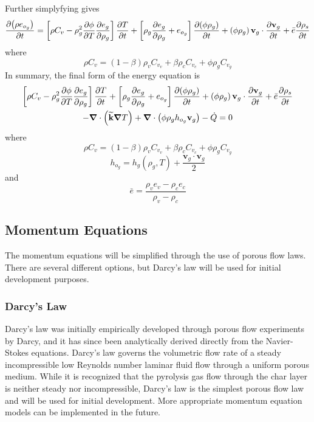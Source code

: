 Further simplyfying gives
\begin{equation}
  {\frac{\partial{\left(\rho e_{o_{g}}\right)}}{\partial{t}}} = \left[\rho C_{v} - \rho_{g}^{2} {\frac{\partial{\phi}}{\partial{T}}}{\frac{\partial{e_{g}}}{\partial{\rho_{g}}}} \right]{\frac{\partial{T}}{\partial{t}}} + \left[ \rho_{g} {\frac{\partial{e_{g}}}{\partial{\rho_{g}}}} + e_{o_{g}} \right]{\frac{\partial{\left(\phi\rho_{g}\right)}}{\partial{t}}} + \left(\phi\rho_{g}\right) \mathbf{v}_{g} \cdot {\frac{\partial{\mathbf{v}_{g}}}{\partial{t}}} + \bar{e}{\frac{\partial{\rho_{s}}}{\partial{t}}}
\end{equation}
where
\begin{equation}
  \rho C_{v} = \left(1 - \beta \right)\rho_{v} C_{v_{v}} + \beta \rho_{c} C_{v_{c}} + \phi \rho_{g} C_{v_{g}}
\end{equation}
In summary, the final form of the energy equation is
\begin{multline}
  \left[\rho C_{v} - \rho_{g}^{2} {\frac{\partial{\phi}}{\partial{T}}}{\frac{\partial{e_{g}}}{\partial{\rho_{g}}}} \right]{\frac{\partial{T}}{\partial{t}}} + \left[ \rho_{g} {\frac{\partial{e_{g}}}{\partial{\rho_{g}}}} + e_{o_{g}} \right]{\frac{\partial{\left(\phi\rho_{g}\right)}}{\partial{t}}} + \left(\phi\rho_{g}\right) \mathbf{v}_{g} \cdot {\frac{\partial{\mathbf{v}_{g}}}{\partial{t}}} + \bar{e}{\frac{\partial{\rho_{s}}}{\partial{t}}}
\\ - {\boldsymbol{\nabla}} {}\cdot\left(\widetilde{\textbf{k}} {\boldsymbol{\nabla}} {T}\right) + {\boldsymbol{\nabla}} {}\cdot\left(\phi \rho_g h_{o_{g}} \textbf{v}_g \right) - \dot{Q}= 0
\end{multline}
where
\begin{equation}
  \rho C_{v} = \left(1 - \beta \right)\rho_{v} C_{v_{v}} + \beta \rho_{c} C_{v_{c}} + \phi \rho_{g} C_{v_{g}}
\end{equation}
\begin{equation}
  h_{o_{g}} = h_{g}\left(\rho_{g},T\right) + \frac{\mathbf{v}_{g} \cdot \mathbf{v}_{g}}{2}
\end{equation}
and
\begin{equation}
  \bar{e} = \frac{\rho_{v}e_{v}-\rho_{c}e_{c}}{\rho_{v}-\rho_{c}}
\end{equation}

\subsection{Momentum Equations}
The momentum equations will be simplified through the use of porous flow laws.  There are several different options, but Darcy's law will be used for initial development purposes.
\subsubsection{Darcy's Law}
Darcy's law was initially empirically developed through porous flow experiments by Darcy, and it has since been analytically derived directly from the Navier-Stokes equations.  Darcy's law governs the volumetric flow rate of a steady incompressible low Reynolds number laminar fluid flow through a uniform porous medium.  While it is recognized that the pyrolysis gas flow through the char layer is neither steady nor incompressible, Darcy's law is the simplest porous flow law and will be used for initial development.  More appropriate momentum equation models can be implemented in the future.

